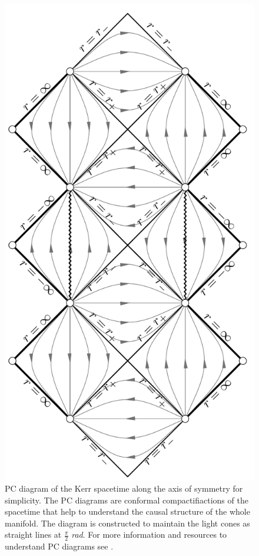  \begin{figure}[htp!]
\begin{center}
 \centerline{\includegraphics[width=.4\textwidth]{img/Chapter2/Diagrama.png}}
 \end{center}
 \caption{\gls{PC} diagram of the Kerr spacetime along the axis of symmetry for simplicity. The \gls{PC} diagrams are conformal compactifiactions of the spacetime that help to understand the causal structure of the whole manifold. The diagram is constructed to maintain the light cones as straight lines at $\frac{\pi}{2}$ \textit{rad}. For more information and resources to understand \gls{PC} diagrams see \cite{o1995geometry,hawking1973large}.}
 \label{fig:Penrose}
\end{figure} 
